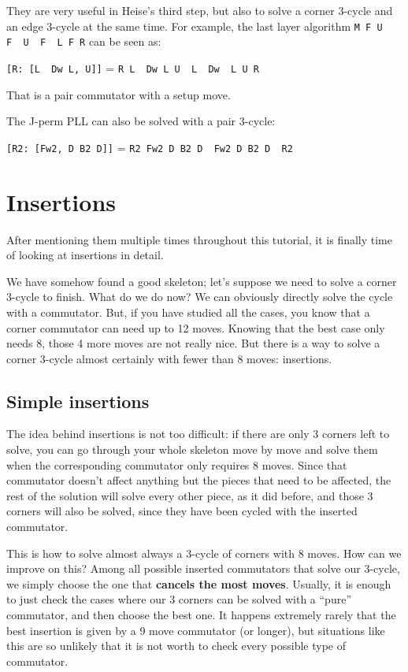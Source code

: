 \documentclass[11pt,a4paper]{book}
\newcommand{\p}{\textquotesingle}
\newcommand{\m}{\texttt}
\newcommand{\ps}{\p\,\,}
\begin{document}
They are very useful in Heise's third step, but also to solve a corner 3-cycle and an edge 3-cycle at the same time. For example, the last layer algorithm \m{M F U F\ps U\ps F\ps L F R\p} can be seen as:

\begin{center}
\m{[R: [L\ps Dw L, U\p]]} = \m{R L\ps Dw L U\ps L\ps Dw\ps L U R\p}
\end{center}

That is a pair commutator with a setup move.

The J-perm PLL can also be solved with a pair 3-cycle:

\begin{center}
\m{[R2: [Fw2, D B2 D\p]]} = \m{R2 Fw2 D B2 D\ps Fw2 D B2 D\ps R2}
\end{center}

\section{Insertions}

After mentioning them multiple times throughout this tutorial, it is finally time of looking at insertions in detail.

We have somehow found a good skeleton; let's suppose we need to solve a corner 3-cycle to finish. What do we do now? We can obviously directly solve the cycle with a commutator. But, if you have studied all the cases, you know that a corner commutator can need up to 12 moves. Knowing that the best case only needs 8, those 4 more moves are not really nice. But there is a way to solve a corner 3-cycle almost certainly with fewer than 8 moves: insertions.

\subsection{Simple insertions}

The idea behind insertions is not too difficult: if there are only 3 corners left to solve, you can go through your whole skeleton move by move and solve them when the corresponding commutator only requires 8 moves. Since that commutator doesn't affect anything but the pieces that need to be affected, the rest of the solution will solve every other piece, as it did before, and those 3 corners will also be solved, since they have been cycled with the inserted commutator.

This is how to solve almost always a 3-cycle of corners with 8 moves. How can we improve on this? Among all possible inserted commutators that solve our 3-cycle, we simply choose the one that \textbf{cancels the most moves}. Usually, it is enough to just check the cases where our 3 corners can be solved with a ``pure'' commutator, and then choose the best one. It happens extremely rarely that the best insertion is given by a 9 move commutator (or longer), but situations like this are so unlikely that it is not worth to check every possible type of commutator.
\end{document}
